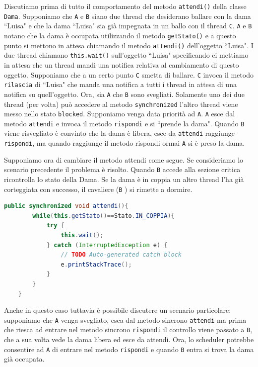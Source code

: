 \documentclass{article}
\begin{document}
Discutiamo prima di tutto il comportamento del metodo \texttt{attendi()} della classe \texttt{Dama}. Supponiamo che \texttt{A} e \texttt{B} siano due thread che desiderano ballare con la dama ``Luisa" e che la dama ``Luisa" sia gi\`a impegnata in un ballo con il thread \texttt{C}. \texttt{A} e \texttt{B} notano che la dama \`e occupata utilizzando il metodo \texttt{getStato()} e a questo punto si mettono in attesa chiamando il metodo \texttt{attendi()} dell'oggetto ``Luisa". I due thread chiamano \texttt{this.wait()} sull'oggetto ``Luisa" specificando ci mettiamo in attesa che un thread mandi una notifica relativa al cambiamento di questo oggetto. Supponiamo che a un certo punto \texttt{C} smetta di ballare. \texttt{C} invoca il metodo \texttt{rilascia} di ``Luisa" che manda una notifica a tutti i thread in attesa di una notifica su quell'oggetto. Ora, sia \texttt{A} che \texttt{B} sono svegliati. Solamente uno dei due thread (per volta)  pu\`o accedere al metodo \texttt{synchronized} l'altro thread viene messo nello stato \texttt{blocked}. Supponiamo venga data priorit\`a ad \texttt{A}. \texttt{A} esce dal metodo \texttt{attendi} e invoca il metodo \texttt{rispondi} e si ``prende la dama". Quando \texttt{B} viene risvegliato \`e convinto che la dama \`e libera, esce da \texttt{attendi} raggiunge \texttt{rispondi}, ma quando raggiunge il metodo rispondi ormai \texttt{A} si \`e preso la dama.

 
Supponiamo ora di cambiare il metodo attendi come segue. Se consideriamo lo scenario precedente il problema \`e risolto. Quando \texttt{B} accede alla sezione critica ricontrolla lo stato della Dama. Se la dama \`e in coppia un altro thread l'ha gi\`a corteggiata con successo, il cavaliere (\texttt{B} ) si rimette a dormire.
\begin{lstlisting}[language=Java]
public synchronized void attendi(){
		while(this.getStato()==Stato.IN_COPPIA){
			try {
				this.wait();
			} catch (InterruptedException e) {
				// TODO Auto-generated catch block
				e.printStackTrace();
			}
		}
	}
\end{lstlisting}
Anche in questo caso tuttavia \`e possibile discutere un scenario particolare: supponiamo che \texttt{A} venga svegliato, esca dal metodo sincrono \texttt{attendi} ma prima che riesca ad entrare nel metodo sincrono \texttt{rispondi} il controllo viene passato a \texttt{B}, che a sua volta vede la dama libera ed esce da attendi. Ora, lo scheduler potrebbe consentire ad \texttt{A} di entrare nel metodo \texttt{rispondi} e quando \texttt{B} entra si trova la dama gi\`a occupata.
\end{document}
